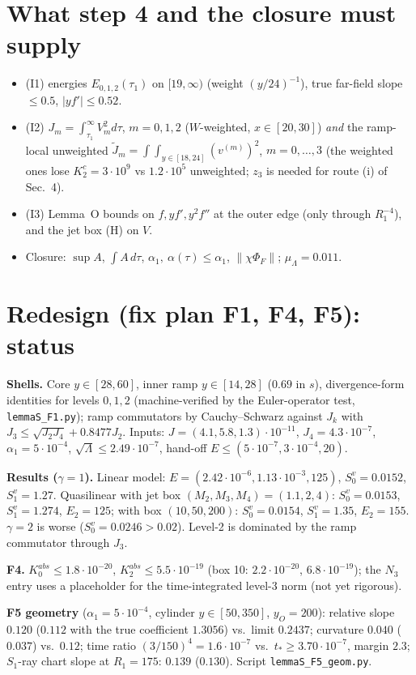 \documentclass[11pt]{article}
\begin{document}
\section{What step 4 and the closure must supply}
\begin{itemize}
\item (I1) energies $E_{0,1,2}(\tau_1)$ on $[19,\infty)$ (weight $(y/24)^{-1}$), true far-field slope $\le0.5$, $|yf'|\le0.52$.
\item (I2) $J_m=\int_{\tau_1}^\infty V_m^2d\tau$, $m=0,1,2$ ($W$-weighted, $x\in[20,30]$) \emph{and} the ramp-local unweighted $\tilde J_m=\int\!\!\int_{y\in[18,24]}(v^{(m)})^2$, $m=0,\dots,3$ (the weighted ones lose $K_2^c=3\cdot10^9$ vs $1.2\cdot10^5$ unweighted; $z_3$ is needed for route (i) of Sec.~4).
\item (I3) Lemma~O bounds on $f,yf',y^2f''$ at the outer edge (only through $R_1^{-4}$), and the jet box (H) on $V$.
\item Closure: $\sup A$, $\int A\,d\tau$, $\alpha_1,\ \alpha(\tau)\le\alpha_1$, $\|\chi\Phi_F\|$; $\mu_\Lambda=0.011$.
\end{itemize}

\section{Redesign (fix plan F1, F4, F5): status}
\textbf{Shells.} Core $y\in[28,60]$, inner ramp $y\in[14,28]$ ($0.69$ in $s$), divergence-form identities for levels $0,1,2$ (machine-verified by the Euler-operator test, \texttt{lemmaS\_F1.py}); ramp commutators by Cauchy--Schwarz against $J_k$ with $J_3\le\sqrt{J_2J_4}+0.8477J_2$. Inputs: $J=(4.1,5.8,1.3)\cdot10^{-11}$, $J_4=4.3\cdot10^{-7}$, $\alpha_1=5\cdot10^{-4}$, $\sqrt\Lambda\le2.49\cdot10^{-7}$, hand-off $E\le(5\cdot10^{-7},3\cdot10^{-4},20)$.

\textbf{Results ($\gamma=1$).} Linear model: $E=(2.42\cdot10^{-6},1.13\cdot10^{-3},125)$, $S_0^v=0.0152$, $S_1^v=1.27$. Quasilinear with jet box $(M_2,M_3,M_4)=(1.1,2,4)$: $S_0^v=0.0153$, $S_1^v=1.274$, $E_2=125$; with box $(10,50,200)$: $S_0^v=0.0154$, $S_1^v=1.35$, $E_2=155$. $\gamma=2$ is worse ($S_0^v=0.0246>0.02$). Level-2 is dominated by the ramp commutator through $J_3$.

\textbf{F4.} $K_0^{abs}\le1.8\cdot10^{-20}$, $K_2^{abs}\le5.5\cdot10^{-19}$ (box 10: $2.2\cdot10^{-20}$, $6.8\cdot10^{-19}$); the $N_3$ entry uses a placeholder for the time-integrated level-3 norm (not yet rigorous).

\textbf{F5 geometry} ($\alpha_1=5\cdot10^{-4}$, cylinder $y\in[50,350]$, $y_O=200$): relative slope $0.120$ ($0.112$ with the true coefficient $1.3056$) vs.\ limit $0.2437$; curvature $0.040$ ($0.037$) vs.\ $0.12$; time ratio $(3/150)^4=1.6\cdot10^{-7}$ vs.\ $t_*\ge3.70\cdot10^{-7}$, margin $2.3$; $S_1$-ray chart slope at $R_1=175$: $0.139$ ($0.130$). Script \texttt{lemmaS\_F5\_geom.py}.
\end{document}
